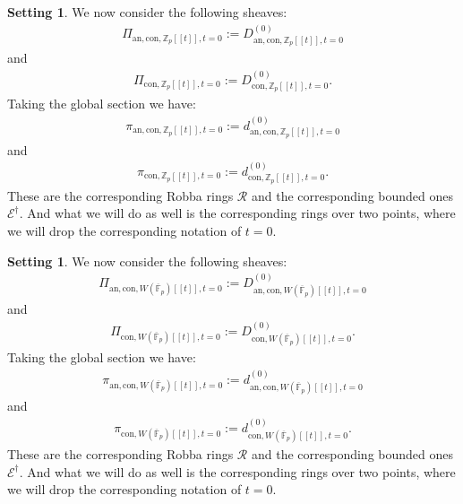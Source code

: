 \documentclass[11pt]{book}
\theoremstyle{definition}
\numberwithin{equation}{section}
\newtheorem{setting}[theorem]{Setting}
\begin{document}
\begin{setting}
We now consider the following sheaves:
\begin{align}
\Pi_{\mathrm{an},\mathrm{con},\mathbb{Z}_p[[t]],t=0}:=D^{(0)}_{\mathrm{an},\mathrm{con},\mathbb{Z}_p[[t]],t=0}	
\end{align}
and 
\begin{align}
\Pi_{\mathrm{con},\mathbb{Z}_p[[t]],t=0}:=D^{(0)}_{\mathrm{con},\mathbb{Z}_p[[t]],t=0}.	
\end{align}	
Taking the global section we have:
\begin{align}
\pi_{\mathrm{an},\mathrm{con},\mathbb{Z}_p[[t]],t=0}:=d^{(0)}_{\mathrm{an},\mathrm{con},\mathbb{Z}_p[[t]],t=0}	
\end{align}
and 
\begin{align}
\pi_{\mathrm{con},\mathbb{Z}_p[[t]],t=0}:=d^{(0)}_{\mathrm{con},\mathbb{Z}_p[[t]],t=0}.	
\end{align}	
These are the corresponding Robba rings $\mathcal{R}$ and the corresponding bounded ones $\mathcal{E}^\dagger$. And what we will do as well is the corresponding rings over two points, where we will drop the corresponding notation of $t=0$.
\end{setting}



\begin{setting}
We now consider the following sheaves:
\begin{align}
\Pi_{\mathrm{an},\mathrm{con},W(\overline{\mathbb{F}}_p)[[t]],t=0}:=D^{(0)}_{\mathrm{an},\mathrm{con},W(\overline{\mathbb{F}}_p)[[t]],t=0}	
\end{align}
and 
\begin{align}
\Pi_{\mathrm{con},W(\overline{\mathbb{F}}_p)[[t]],t=0}:=D^{(0)}_{\mathrm{con},W(\overline{\mathbb{F}}_p)[[t]],t=0}.	
\end{align}	
Taking the global section we have:
\begin{align}
\pi_{\mathrm{an},\mathrm{con},W(\overline{\mathbb{F}}_p)[[t]],t=0}:=d^{(0)}_{\mathrm{an},\mathrm{con},W(\overline{\mathbb{F}}_p)[[t]],t=0}	
\end{align}
and 
\begin{align}
\pi_{\mathrm{con},W(\overline{\mathbb{F}}_p)[[t]],t=0}:=d^{(0)}_{\mathrm{con},W(\overline{\mathbb{F}}_p)[[t]],t=0}.	
\end{align}	
These are the corresponding Robba rings $\mathcal{R}$ and the corresponding bounded ones $\mathcal{E}^\dagger$. And what we will do as well is the corresponding rings over two points, where we will drop the corresponding notation of $t=0$.
\end{setting}
\end{document}

